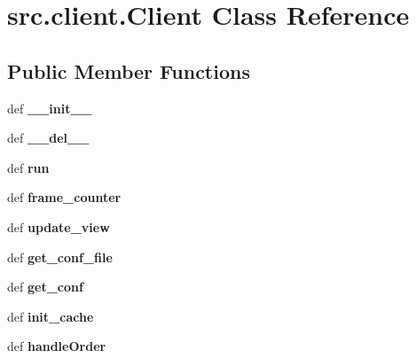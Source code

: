 \hypertarget{classsrc_1_1client_1_1_client}{\section{src.\-client.\-Client \-Class \-Reference}
\label{classsrc_1_1client_1_1_client}
}
\subsection*{\-Public \-Member \-Functions}
\begin{DoxyCompactItemize}
\item 
\hypertarget{classsrc_1_1client_1_1_client_a63e0fbe31d7c47f64ef4e12628f0006f}{def {\bfseries \-\_\-\-\_\-init\-\_\-\-\_\-}}\label{classsrc_1_1client_1_1_client_a63e0fbe31d7c47f64ef4e12628f0006f}

\item 
\hypertarget{classsrc_1_1client_1_1_client_aece67fa18be912de2d7e04840f63d161}{def {\bfseries \-\_\-\-\_\-del\-\_\-\-\_\-}}\label{classsrc_1_1client_1_1_client_aece67fa18be912de2d7e04840f63d161}

\item 
\hypertarget{classsrc_1_1client_1_1_client_a354370a9ad5054293c75e74e79c22280}{def {\bfseries run}}\label{classsrc_1_1client_1_1_client_a354370a9ad5054293c75e74e79c22280}

\item 
\hypertarget{classsrc_1_1client_1_1_client_a6ff2e05841d4fe56bf5d26200763a486}{def {\bfseries frame\-\_\-counter}}\label{classsrc_1_1client_1_1_client_a6ff2e05841d4fe56bf5d26200763a486}

\item 
\hypertarget{classsrc_1_1client_1_1_client_a370da53c7c1f35d0915aea02f5435f29}{def {\bfseries update\-\_\-view}}\label{classsrc_1_1client_1_1_client_a370da53c7c1f35d0915aea02f5435f29}

\item 
\hypertarget{classsrc_1_1client_1_1_client_a4171be6bb67bd1bccfc962070cdd1ac5}{def {\bfseries get\-\_\-conf\-\_\-file}}\label{classsrc_1_1client_1_1_client_a4171be6bb67bd1bccfc962070cdd1ac5}

\item 
\hypertarget{classsrc_1_1client_1_1_client_ae439afc621acd0aa5170187293d876bd}{def {\bfseries get\-\_\-conf}}\label{classsrc_1_1client_1_1_client_ae439afc621acd0aa5170187293d876bd}

\item 
\hypertarget{classsrc_1_1client_1_1_client_aa3c1f7c0648d506a18ef8cc15fa69107}{def {\bfseries init\-\_\-cache}}\label{classsrc_1_1client_1_1_client_aa3c1f7c0648d506a18ef8cc15fa69107}

\item 
\hypertarget{classsrc_1_1client_1_1_client_af341ac55e0b5212451476ea2f69b45e7}{def {\bfseries handle\-Order}}\label{classsrc_1_1client_1_1_client_af341ac55e0b5212451476ea2f69b45e7}

\end{DoxyCompactItemize}
